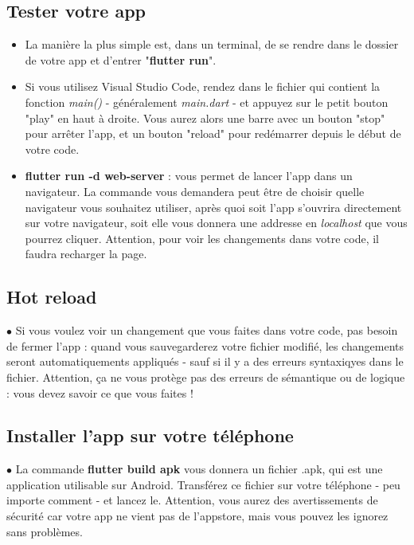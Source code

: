 \subsection{Tester votre app}
\begin{itemize}
  \item La manière la plus simple est, dans un terminal, de se rendre dans le dossier de votre app et d'entrer "\textbf{flutter run}".
  \item Si vous utilisez Visual Studio Code, rendez dans le fichier qui contient la fonction \textit{main()} - généralement \textit{main.dart} - et appuyez sur le petit bouton "play" en haut à droite. Vous aurez alors une barre avec un bouton "stop" pour arrêter l'app, et un bouton "reload" pour redémarrer depuis le début de votre code.
  \item \textbf{flutter run -d web-server} : vous permet de lancer l'app dans un navigateur. La commande vous demandera peut être de choisir quelle navigateur vous souhaitez utiliser, après quoi soit l'app s'ouvrira directement sur votre navigateur, soit elle vous donnera une addresse en \textit{localhost} que vous pourrez cliquer. Attention, pour voir les changements dans votre code, il faudra recharger la page.
\end{itemize}

\subsection{Hot reload}
\par $\bullet$ Si vous voulez voir un changement que vous faites dans votre code, pas besoin de fermer l'app : quand vous sauvegarderez votre fichier modifié, les changements seront automatiquements appliqués - sauf si il y a des erreurs syntaxiqyes dans le fichier. Attention, ça ne vous protège pas des erreurs de sémantique ou de logique : vous devez savoir ce que vous faites !

\subsection{Installer l'app sur votre téléphone}
\par $\bullet$ La commande \textbf{flutter build apk} vous donnera un fichier .apk, qui est une application utilisable sur Android. Transférez ce fichier sur votre téléphone - peu importe comment -  et lancez le. Attention, vous aurez des avertissements de sécurité car votre app ne vient pas de l'appstore, mais vous pouvez les ignorez sans problèmes.
